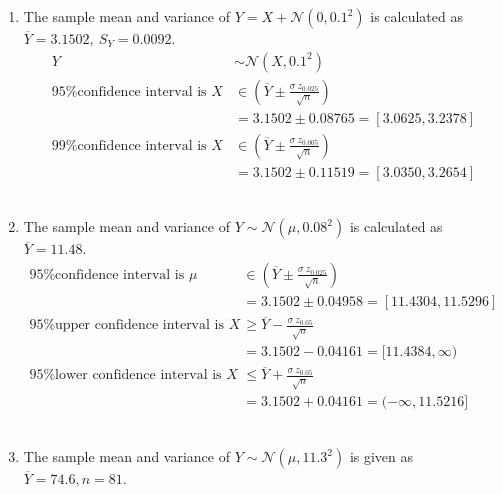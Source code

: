 \begin{enumerate}
\begin{enumerate}
		\end{enumerate}
	
	
	\item The sample mean and variance of $ Y = X + \mathcal{N} (0, 0.1^2) $ is calculated as \\
	$ \overline{Y} = 3.1502,\ S_Y = 0.0092 $. \\
	
	
		\begin{align}
			Y &\sim \mathcal{N}(X, 0.1^2) \nonumber \\
			\text{95\% confidence interval is } X &\in \left(\overline{Y} \pm\frac{\sigma\ z_{0.025}}{\sqrt{n}}\right) \nonumber \\
			&= 3.1502 \pm 0.08765 = [3.0625, 3.2378] \\
			\text{99\% confidence interval is } X &\in \left(\overline{Y} \pm\frac{\sigma\ z_{0.005}}{\sqrt{n}}\right) \nonumber \\
			&= 3.1502 \pm 0.11519 = [3.0350, 3.2654]
		\end{align}\\
	
	
	\item The sample mean and variance of $ Y \sim \mathcal{N} (\mu, 0.08^2) $ is calculated as \\
	$ \overline{Y} = 11.48$. \\
	
	
		\begin{align}
			\text{95\% confidence interval is } \mu &\in \left(\overline{Y} \pm\frac{\sigma\ z_{0.025}}{\sqrt{n}}\right) \nonumber \\
			&= 3.1502 \pm 0.04958 = [11.4304, 11.5296] \\
			\text{95\% upper confidence interval is } X &\geq \overline{Y} - \frac{\sigma\ z_{0.05}}{\sqrt{n}} \nonumber \\
			&= 3.1502 - 0.04161 = [11.4384, \infty) \nonumber \\
			\text{95\% lower confidence interval is } X &\leq \overline{Y} + \frac{\sigma\ z_{0.05}}{\sqrt{n}} \nonumber \\
			&= 3.1502 + 0.04161 = (-\infty, 11.5216]
		\end{align}\\
	
	
	\item The sample mean and variance of $ Y \sim \mathcal{N} (\mu, 11.3^2) $ is given as \\
	$ \overline{Y} = 74.6, n = 81$. \\
	

\end{enumerate}
